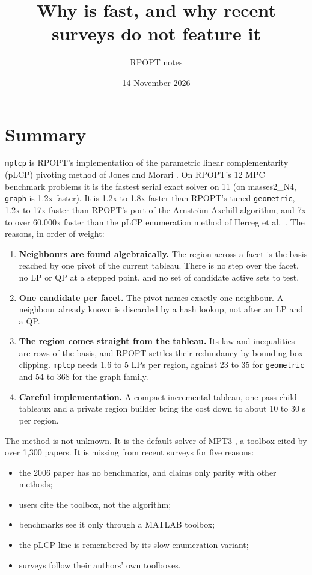 \documentclass[11pt]{article}
\title{Why \code{mplcp} is fast, and why recent surveys do not feature it}
\author{RPOPT notes}
\date{14 November 2026}
\newcommand{\code}[1]{\texttt{#1}}
\let\oldsection\section
\renewcommand{\section}{\Needspace{8\baselineskip}\oldsection}
\begin{document}
\maketitle

\section{Summary}

\code{mplcp} is RPOPT's implementation of the parametric linear complementarity (pLCP) pivoting method of Jones and
Morari \cite{jm2006}. On RPOPT's 12 MPC benchmark problems it is the fastest serial exact solver on 11 (on
masses2\_N4, \code{graph} is 1.2x faster). It is 1.2x to 1.8x faster than RPOPT's tuned \code{geometric}, 1.2x to
17x faster than RPOPT's port of the Arnstr\"om-Axehill algorithm, and 7x to over 60,000x faster than the pLCP
enumeration method of Herceg et al.\ \cite{herceg2015}. The reasons, in order of weight:

\begin{enumerate}
  \item \textbf{Neighbours are found algebraically.} The region across a facet is the basis reached by one pivot of
  the current tableau. There is no step over the facet, no LP or QP at a stepped point, and no set of candidate
  active sets to test.
  \item \textbf{One candidate per facet.} The pivot names exactly one neighbour. A neighbour already known is
  discarded by a hash lookup, not after an LP and a QP.
  \item \textbf{The region comes straight from the tableau.} Its law and inequalities are rows of the basis, and
  RPOPT settles their redundancy by bounding-box clipping. \code{mplcp} needs 1.6 to 5 LPs per region, against 23
  to 35 for \code{geometric} and 54 to 368 for the graph family.
  \item \textbf{Careful implementation.} A compact incremental tableau, one-pass child tableaux and a private region
  builder bring the cost down to about 10 to 30 \textmu s per region.
\end{enumerate}

\noindent The method is not unknown. It is the default solver of MPT3 \cite{mpt3}, a toolbox cited by over 1,300
papers. It is missing from recent surveys for five reasons:
\begin{itemize}
  \item the 2006 paper has no benchmarks, and claims only parity with other methods;
  \item users cite the toolbox, not the algorithm;
  \item benchmarks see it only through a MATLAB toolbox;
  \item the pLCP line is remembered by its slow enumeration variant;
  \item surveys follow their authors' own toolboxes.
\end{itemize}
\end{document}
